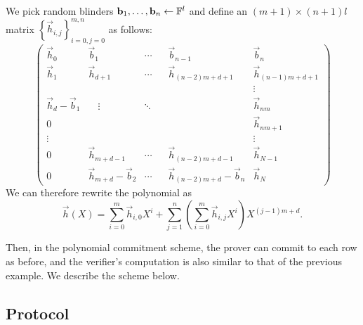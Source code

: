 We pick random blinders $\mathbf{b}_1,\ldots,\mathbf{b}_n\gets \mathbb{F}^l$ and define an $(m+1)\times (n+1)l$ matrix $\left\{ \vec{h}_{i,j} \right\}_{i=0,j=0}^{m,n}$ as follows:
$$\left(\begin{array}{lllll}
\vec{h}_0 & \vec{b}_{1} & \cdots & \vec{b}_{n-1} & \vec{b}_n \\
\vec{h}_1 & \vec{h}_{d+1} & \cdots & \vec{h}_{(n-2)m+d+1} & \vec{h}_{(n-1)m+d+1}\\
&&&& \vdots \\
\vec{h}_d-\vec{b}_1 & \quad \vdots & \ddots \quad & & \vec{h}_{nm}\\
0 &&&& \vec{h}_{nm+1}\\
\vdots &&&& \vdots  \\
0 & \vec{h}_{m+d-1}  & \cdots  & \vec{h}_{(n-2)m+d-1} & \vec{h}_{N-1} \\
0 & \vec{h}_{m+d}-\vec{b}_2 & \cdots & \vec{h}_{(n-2)m+d}-\vec{b}_n & \vec{h}_{N}
\end{array} \right)$$
We can therefore rewrite the polynomial as $$\vec{h}(X)=\sum_{i=0}^m\vec{h}_{i,0}X^i +\sum_{j=1}^{n} \left(\sum_{i=0}^m\vec{h}_{i,j}X^i \right)X^{(j-1)m+d}.$$

Then, in the polynomial commitment scheme, the prover can commit to each row as before, and the verifier's computation is also similar to that of the previous example. We describe the scheme below.

\subsection{Protocol}


